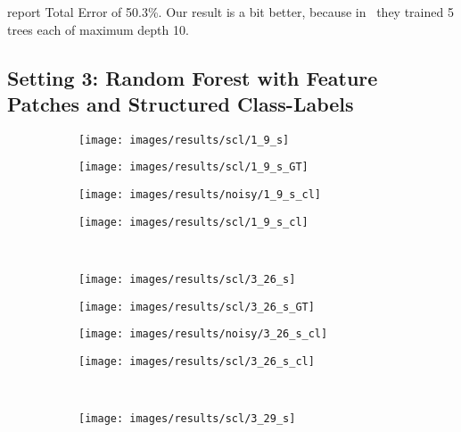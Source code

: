 \cite{Shotton2008} report Total Error of 50.3\%. Our result is a bit better, because in~\cite{Shotton2008} they trained 5 trees each of maximum depth 10.

\subsection{Setting 3: Random Forest with Feature Patches and Structured Class-Labels}
\label{msrc_setting_3}

\begin{figure}[t]
 \centering
 \begin{subfigure}[c]{0.24\textwidth}
  \centering
  \texttt{[image: images/results/scl/1\_9\_s]}
 \end{subfigure}
 \begin{subfigure}[c]{0.24\textwidth}
  \centering
  \texttt{[image: images/results/scl/1\_9\_s\_GT]}
 \end{subfigure}
 \begin{subfigure}[c]{0.24\textwidth}
  \centering
  \texttt{[image: images/results/noisy/1\_9\_s\_cl]}
 \end{subfigure}
 \begin{subfigure}[c]{0.24\textwidth}
  \centering
  \texttt{[image: images/results/scl/1\_9\_s\_cl]}
 \end{subfigure}
 \\
 \begin{subfigure}[c]{0.24\textwidth}
  \centering
  \texttt{[image: images/results/scl/3\_26\_s]}
 \end{subfigure}
 \begin{subfigure}[c]{0.24\textwidth}
  \centering
  \texttt{[image: images/results/scl/3\_26\_s\_GT]}
 \end{subfigure}
 \begin{subfigure}[c]{0.24\textwidth}
  \centering
  \texttt{[image: images/results/noisy/3\_26\_s\_cl]}
 \end{subfigure}
 \begin{subfigure}[c]{0.24\textwidth}
  \centering
  \texttt{[image: images/results/scl/3\_26\_s\_cl]}
 \end{subfigure}
 \\
 \begin{subfigure}[c]{0.24\textwidth}
  \centering
  \texttt{[image: images/results/scl/3\_29\_s]}
 \end{subfigure}
 \begin{subfigure}[c]{0.24\textwidth}

\end{subfigure}
\end{figure}
